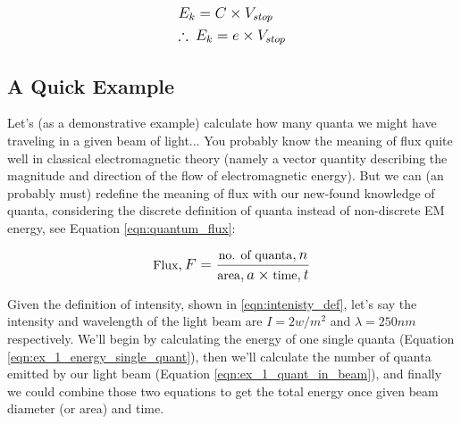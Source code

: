 \documentclass[colorlinks,11pt,a4paper,normalphoto,withhyper,ragged2e]{altareport}
\begin{document}
	\begin{align}
		& \mathlarger{ E_k = C \times V_{stop} } \nonumber\\
		& \label{eqn:photoelectric_vstop} \mathlarger{ \therefore \: E_k = e \times V_{stop} }
	\end{align}
	
		
	\subsection{A Quick Example}
		Let's (as a demonstrative example) calculate how many quanta we might have traveling in a given beam of light... \linebreak
		You probably know the meaning of flux quite well in classical electromagnetic theory (namely a vector quantity describing the magnitude and direction of the flow of electromagnetic energy). But we can (an probably must) redefine the meaning of flux with our new-found knowledge of quanta, considering the discrete definition of quanta instead of non-discrete EM energy, see Equation \ref{eqn:quantum_flux}: \linebreak
		
		\begin{equation}
			\label{eqn:quantum_flux} \mathlarger{\text{\normalsize Flux}, F = \frac{\text{\normalsize no. of quanta}, n}{\text{\normalsize area}, a \times \text{\normalsize time}, t}}
		\end{equation}
		
		\vspace{5mm}
		
		Given the definition of intensity, shown in \ref{eqn:intenisty_def}, let's say the intensity and wavelength of the light beam are $I=2w/m^2$ and $\lambda=250nm$ respectively. We'll begin by calculating the energy of one single quanta (Equation \ref{eqn:ex_1_energy_single_quant}), then we'll calculate the number of quanta emitted by our light beam (Equation \ref{eqn:ex_1_quant_in_beam}), and finally we could combine those two equations to get the total energy once given beam diameter (or area) and time. \linebreak
	
\end{document}
